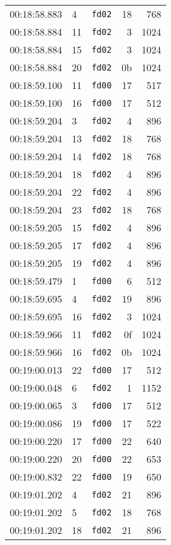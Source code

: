 \documentclass{article}
\begin{document}
\begin{longtable}{lllrr}
00:18:58.883 & 4 & \texttt{fd02} & 18 & 768 \\
00:18:58.884 & 11 & \texttt{fd02} & 3 & 1024 \\
00:18:58.884 & 15 & \texttt{fd02} & 3 & 1024 \\
00:18:58.884 & 20 & \texttt{fd02} & 0b & 1024 \\
00:18:59.100 & 11 & \texttt{fd00} & 17 & 517 \\
00:18:59.100 & 16 & \texttt{fd00} & 17 & 512 \\
00:18:59.204 & 3 & \texttt{fd02} & 4 & 896 \\
00:18:59.204 & 13 & \texttt{fd02} & 18 & 768 \\
00:18:59.204 & 14 & \texttt{fd02} & 18 & 768 \\
00:18:59.204 & 18 & \texttt{fd02} & 4 & 896 \\
00:18:59.204 & 22 & \texttt{fd02} & 4 & 896 \\
00:18:59.204 & 23 & \texttt{fd02} & 18 & 768 \\
00:18:59.205 & 15 & \texttt{fd02} & 4 & 896 \\
00:18:59.205 & 17 & \texttt{fd02} & 4 & 896 \\
00:18:59.205 & 19 & \texttt{fd02} & 4 & 896 \\
00:18:59.479 & 1 & \texttt{fd00} & 6 & 512 \\
00:18:59.695 & 4 & \texttt{fd02} & 19 & 896 \\
00:18:59.695 & 16 & \texttt{fd02} & 3 & 1024 \\
00:18:59.966 & 11 & \texttt{fd02} & 0f & 1024 \\
00:18:59.966 & 16 & \texttt{fd02} & 0b & 1024 \\
00:19:00.013 & 22 & \texttt{fd00} & 17 & 512 \\
00:19:00.048 & 6 & \texttt{fd02} & 1 & 1152 \\
00:19:00.065 & 3 & \texttt{fd00} & 17 & 512 \\
00:19:00.086 & 19 & \texttt{fd00} & 17 & 522 \\
00:19:00.220 & 17 & \texttt{fd00} & 22 & 640 \\
00:19:00.220 & 20 & \texttt{fd00} & 22 & 653 \\
00:19:00.832 & 22 & \texttt{fd00} & 19 & 650 \\
00:19:01.202 & 4 & \texttt{fd02} & 21 & 896 \\
00:19:01.202 & 5 & \texttt{fd02} & 18 & 768 \\
00:19:01.202 & 18 & \texttt{fd02} & 21 & 896 \\

\end{longtable}
\end{document}
